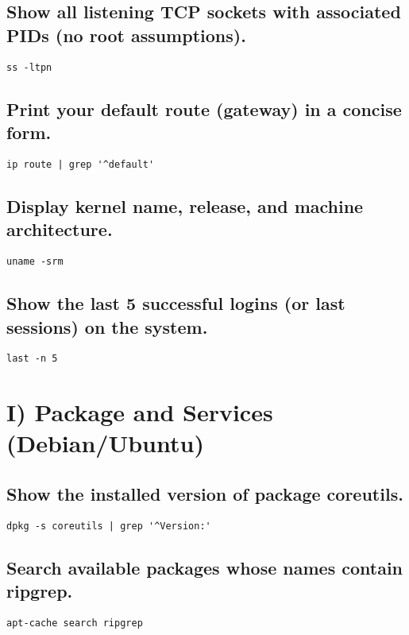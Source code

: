 \subsection{Show all listening TCP sockets with associated PIDs (no root assumptions).}
\begin{verbatim}
ss -ltpn
\end{verbatim}

\subsection{Print your default route (gateway) in a concise form.}
\begin{verbatim}
ip route | grep '^default'
\end{verbatim}

\subsection{Display kernel name, release, and machine architecture.}
\begin{verbatim}
uname -srm
\end{verbatim}

\subsection{ Show the last 5 successful logins (or last sessions) on the system.}
\begin{verbatim}
last -n 5
\end{verbatim}

\section{ I) Package and Services (Debian/Ubuntu)}
\subsection{Show the installed version of package coreutils.}
\begin{verbatim}
dpkg -s coreutils | grep '^Version:'
\end{verbatim}

\subsection{Search available packages whose names contain ripgrep.}
\begin{verbatim}
apt-cache search ripgrep
\end{verbatim}

